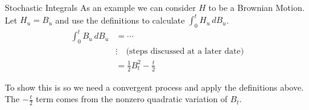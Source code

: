 \documentclass[12pt]{article}
\newlength\tindent
\renewcommand{\indent}{\hspace*{\tindent}}
\begin{document}
\begin{section}{Stochastic Integrals}
\indent As an example we can consider $H$ to be a Brownian Motion. Let $H_u = B_u$ and use the definitions to calculate $\int^t_0 H_u\,dB_u$.
\begin{align*}
	 \int^t_0 B_u\,dB_u &= \cdots \\
	&\vdots \quad \text{(steps discussed at a later date)} \\
	&= \frac{1}{2}B^2_t - \frac{t}{2}
\end{align*}

\indent To show this is so we need a convergent process and apply the definitions above. The $-\frac{t}{2}$ term comes from the nonzero quadratic variation of $B_t$.













\end{section}
\end{document}
